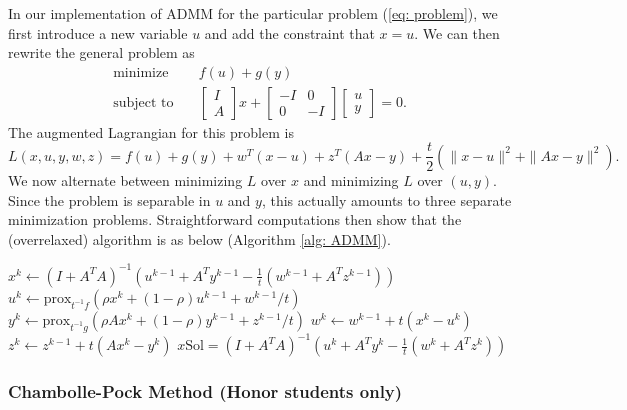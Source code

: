 \documentclass[12pt]{article}
\begin{document}
In our implementation of ADMM for the particular problem (\ref{eq: problem}), we first introduce a new variable $u$ and add the constraint that $x=u$. We can then rewrite the general problem as
\begin{align*}
 \text{minimize} \quad & f(u) + g(y) \\
\text{subject to} \quad & \left[ \begin{array}{c} I \\ A \end{array} \right] x + \left[ \begin{array}{cc} - I & 0 \\ 0 & - I \end{array} \right] \left[ \begin{array}{c} u \\ y \end{array} \right] = 0.
\end{align*}
The augmented Lagrangian for this problem is
\[ L(x,u, y, w, z) = f(u) + g(y) + w^T (x-u) + z^T (Ax-y) + \frac{t}{2} \left( \| x-u\|^2 + \|Ax-y\|^2 \right).\]
We now alternate between minimizing $L$ over $x$ and minimizing $L$ over $(u,y).$ Since the problem is separable in $u$ and $y$, this actually amounts to three separate minimization problems. Straightforward computations then show that the (overrelaxed) algorithm is as below (Algorithm \ref{alg: ADMM}).

\begin{algorithm}[h!]

 {
  $ x^k \leftarrow (I+A^TA)^{-1} \left( u^{k-1} + A^T y^{k-1} - \frac{1}{t} (w^{k-1} + A^T z^{k-1} )\right) $ \;
  $ u^k \leftarrow \text{prox}_{t^{-1}f}(\rho x^k + (1-\rho)u^{k-1} +  w^{k-1}/t )$ \;
  $ y^k \leftarrow \text{prox}_{t^{-1}g}(\rho Ax^k + (1-\rho)y^{k-1} + z^{k-1}/t )$ \;
  $ w^k \leftarrow w^{k-1} + t(x^k - u^k)$ \;
  $ z^k \leftarrow z^{k-1} + t(Ax^k - y^k)$ \;
} 
\Return $x\text{Sol} =  (I+A^TA)^{-1} \left( u^{k} + A^T y^{k} - \frac{1}{t} (w^{k} + A^T z^{k} )\right) $\;
\caption{Alternating Direction Method of Multipliers (ADMM)}\label{alg: ADMM} 
\end{algorithm}

\subsubsection{Chambolle-Pock Method (Honor students only)}
\end{document}
